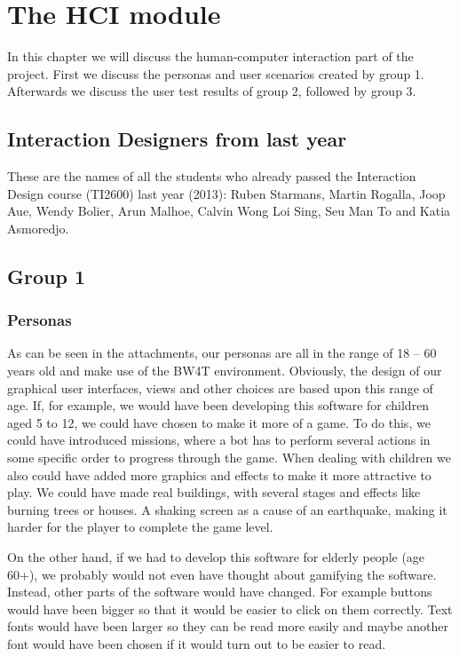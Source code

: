 \chapter{The HCI module}
In this chapter we will discuss the human-computer interaction part of the project. First we discuss the personas and user scenarios created by group 1. Afterwards we discuss the user test results of group 2, followed by group 3.

\section{Interaction Designers from last year}
These are the names of all the students who already passed the Interaction Design course (TI2600) last year (2013): Ruben Starmans, Martin Rogalla, Joop Aue, Wendy Bolier, Arun Malhoe, Calvin Wong Loi Sing, Seu Man To and Katia Asmoredjo.

\section{Group 1}

\subsection*{Personas}
As can be seen in the attachments, our personas are all in the range of 18 – 60 years old and make use of the BW4T environment. Obviously, the design of our graphical user interfaces, views and other choices are based upon this range of age. If, for example, we would have been developing this software for children aged 5 to 12, we could have chosen to make it more of a game. To do this, we could have introduced missions, where a bot has to perform several actions in some specific order to progress through the game. 
When dealing with children we also could have added more graphics and effects to make it more attractive to play. We could have made real buildings, with several stages and effects like burning trees or houses. A shaking screen as a cause of an earthquake, making it harder for the player to complete the game level. 

On the other hand, if we had to develop this software for elderly people (age 60+), we probably would not even have thought about gamifying the software. Instead, other parts of the software would have changed. For example buttons would have been bigger so that it would be easier to click on them correctly. Text fonts would have been larger so they can be read more easily and maybe another font would have been chosen if it would turn out to be easier to read.\\


